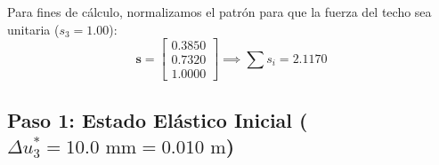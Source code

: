 \documentclass[11pt,letterpaper]{article}
\begin{document}
\begin{itemize}
\begin{equation}
    \end{equation}
    Para fines de cálculo, normalizamos el patrón para que la fuerza del techo sea unitaria ($s_3 = 1.00$):
    \begin{equation}
        \mathbf{s} = \begin{bmatrix} 0.3850 \\ 0.7320 \\ 1.0000 \end{bmatrix} \implies \sum s_i = 2.1170
    \end{equation}
\end{itemize}

\subsection{Paso 1: Estado Elástico Inicial (\texorpdfstring{$\Delta u_3^* = 10.0\text{ mm} = 0.010\text{ m}$}{Delta u3 = 10.0 mm})}
\end{document}
